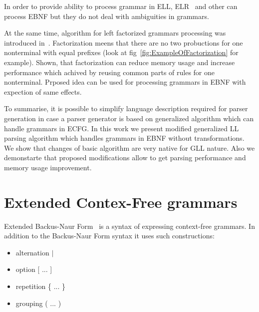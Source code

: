 \documentclass[runningheads,a4paper]{llncs}
\begin{document}
In order to provide ability to process grammar in ELL, ELR~\cite{AttributedELL,ELRR,ECFGparsing,ELLParser,ELL,ECFG,ELALR,ELRParsing} and other can process EBNF but they do not deal with ambiguities in grammars.

At the same time, algorithm for left factorized grammars processing was introduced in~\cite{scott2016structuring}.
Factorization meens that there are no two probuctions for one nonterminal with equal prefixes (look at fig~\ref{fig:ExampleOfFactorization} for example).
Shown, that factorization can reduce memory usage and increase performance which achived by reusing common parts of rules for one nonterminal.
Prposed idea can be used for processing grammars in EBNF with expection of same effects.

To summarise, it is possible to simplify language description required for parser generation in case a parser generator is based on generalized algorithm which can handle grammars in ECFG.
In this work we present modified generalized LL parsing algorithm which handles grammars in EBNF without transformations.
We show that changes of basic algorithm are very native for GLL nature. 
Also we demonstarte that proposed modifications allow to get parsing performance and memory usage improvement.





\section{Extended Contex-Free grammars}%

Extended Backus-Naur Form~\cite{EBNFISO} is a syntax of expressing context-free grammars. In addition to the Backus-Naur Form syntax it 
uses such constructions:

\begin{itemize}
    \item alternation $\mid$
    \item option [ ... ]
    \item repetition \{ ... \}
    \item grouping ( ... )
\end{itemize}
\end{document}
